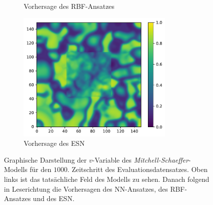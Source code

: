 \begin{appendices}
\begin{figure}[h]
\begin{subfigure}{.5\textwidth}
		\setcapmargin[1cm]{0.5cm}
  		\caption{Vorhersage des \textsc{RBF}-Ansatzes}
	\end{subfigure}%
	\begin{subfigure}{.5\textwidth}
		\centering
		\includegraphics[height=2.5in]{figures/results/inner_cross_prediction/mitchell_v_inner_esn.pdf}
		\setcapmargin[1cm]{0.5cm}
  		\caption{Vorhersage des \textsc{ESN}}
	\end{subfigure}
	\caption{Graphische Darstellung der $v$-Variable des \textit{Mitchell-Schaeffer}-Modells für den $1000$. Zeitschritt des Evaluationsdatensatzes. Oben links ist das tatsächliche Feld des Modells zu sehen. Danach folgend in Leserichtung die Vorhersagen des \textsc{NN}-Ansatzes, des \textsc{RBF}-Ansatzes und des \textsc{ESN}.}
	\label{fig:apx_inner_cross_mitchell_result}
\end{figure} 


\end{appendices}
